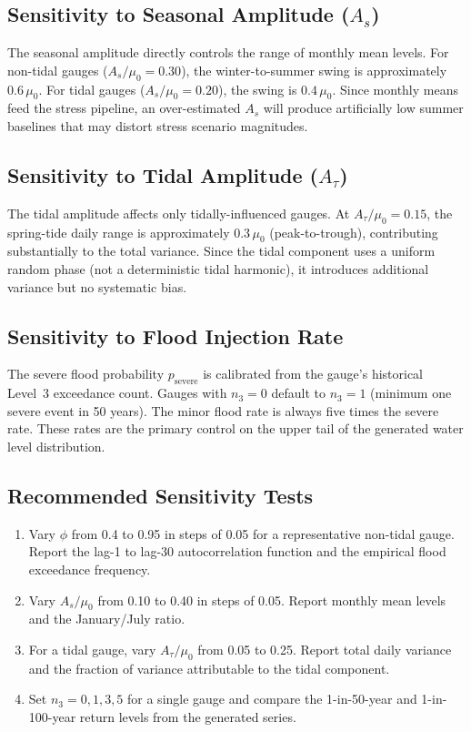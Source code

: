 \documentclass[11pt,a4paper]{article}
\begin{document}
\subsection{Sensitivity to Seasonal Amplitude ($A_s$)}

The seasonal amplitude directly controls the range of monthly mean levels. For non-tidal
gauges ($A_s / \mu_0 = 0.30$), the winter-to-summer swing is approximately $0.6\,\mu_0$.
For tidal gauges ($A_s / \mu_0 = 0.20$), the swing is $0.4\,\mu_0$. Since monthly means
feed the stress pipeline, an over-estimated $A_s$ will produce artificially low summer
baselines that may distort stress scenario magnitudes.

\subsection{Sensitivity to Tidal Amplitude ($A_{\tau}$)}

The tidal amplitude affects only tidally-influenced gauges. At $A_{\tau} / \mu_0 = 0.15$,
the spring-tide daily range is approximately $0.3\,\mu_0$ (peak-to-trough), contributing
substantially to the total variance. Since the tidal component uses a uniform random phase
(not a deterministic tidal harmonic), it introduces additional variance but no systematic
bias.

\subsection{Sensitivity to Flood Injection Rate}

The severe flood probability $p_{\text{severe}}$ is calibrated from the gauge's historical
Level~3 exceedance count. Gauges with $n_3 = 0$ default to $n_3 = 1$ (minimum one severe
event in 50 years). The minor flood rate is always five times the severe rate. These
rates are the primary control on the upper tail of the generated water level distribution.

\subsection{Recommended Sensitivity Tests}

\begin{enumerate}[nosep]
    \item Vary $\phi$ from 0.4 to 0.95 in steps of 0.05 for a representative non-tidal
          gauge. Report the lag-1 to lag-30 autocorrelation function and the empirical
          flood exceedance frequency.
    \item Vary $A_s / \mu_0$ from 0.10 to 0.40 in steps of 0.05. Report monthly mean
          levels and the January/July ratio.
    \item For a tidal gauge, vary $A_{\tau} / \mu_0$ from 0.05 to 0.25. Report total
          daily variance and the fraction of variance attributable to the tidal component.
    \item Set $n_3 = 0, 1, 3, 5$ for a single gauge and compare the 1-in-50-year and
          1-in-100-year return levels from the generated series.
\end{enumerate}
\end{document}
